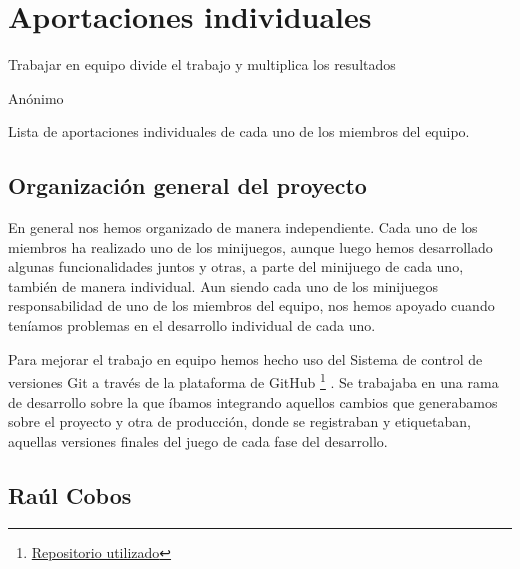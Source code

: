 %
%

\chapter{Aportaciones individuales}

\begin{FraseCelebre}
\begin{Frase}
Trabajar en equipo divide el trabajo y multiplica los resultados
\end{Frase}
\begin{Fuente}
Anónimo
\end{Fuente}
\end{FraseCelebre}


Lista de aportaciones individuales de cada uno de los miembros del equipo.

\section{Organización general del proyecto}
\label{cap10:sec:general}

En general nos hemos organizado de manera independiente. Cada uno de los miembros ha realizado uno de los minijuegos, aunque luego hemos desarrollado algunas funcionalidades juntos y otras, a parte del minijuego de cada uno, también de manera individual. Aun siendo cada uno de los minijuegos responsabilidad de uno de los miembros del equipo, nos hemos apoyado cuando teníamos problemas en el desarrollo individual de cada uno.

Para mejorar el trabajo en equipo hemos hecho uso del Sistema de control de versiones Git a través de la plataforma de GitHub \footnote{\href{https://github.com/rulo7/AUNGMENTED_REALITY_UNITY.git}{Repositorio utilizado}} . Se trabajaba en una rama de desarrollo sobre la que íbamos integrando aquellos cambios que generabamos sobre el proyecto y otra de producción, donde se registraban y etiquetaban, aquellas versiones finales del juego de cada fase del desarrollo.

\section{Raúl Cobos}
\label{cap10:sec:raul}


